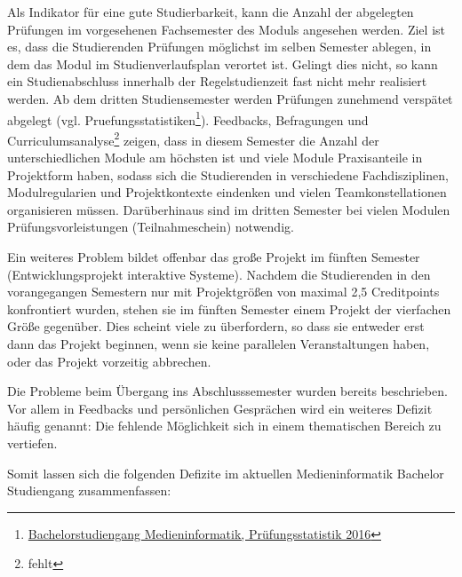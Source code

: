 Als Indikator für eine gute Studierbarkeit, kann die Anzahl der
abgelegten Prüfungen im vorgesehenen Fachsemester des Moduls angesehen
werden. Ziel ist es, dass die Studierenden Prüfungen möglichst im selben
Semester ablegen, in dem das Modul im Studienverlaufsplan verortet ist.
Gelingt dies nicht, so kann ein Studienabschluss innerhalb der
Regelstudienzeit fast nicht mehr realisiert werden. Ab dem dritten
Studiensemester werden Prüfungen zunehmend verspätet abgelegt (vgl.
Pruefungsstatistiken\footnote{\href{../anhaenge/pruefungsstatistiken.pdf}{Bachelorstudiengang
  Medieninformatik, Prüfungsstatistik 2016}}). Feedbacks, Befragungen
und Curriculumsanalyse\footnote{fehlt} zeigen, dass in diesem Semester
die Anzahl der unterschiedlichen Module am höchsten ist und viele Module
Praxisanteile in Projektform haben, sodass sich die Studierenden in
verschiedene Fachdisziplinen, Modulregularien und Projektkontexte
eindenken und vielen Teamkonstellationen organisieren müssen.
Darüberhinaus sind im dritten Semester bei vielen Modulen
Prüfungsvorleistungen (Teilnahmeschein) notwendig.

Ein weiteres Problem bildet offenbar das große Projekt im fünften
Semester (Entwicklungsprojekt interaktive Systeme). Nachdem die
Studierenden in den vorangegangen Semestern nur mit Projektgrößen von
maximal 2,5 Creditpoints konfrontiert wurden, stehen sie im fünften
Semester einem Projekt der vierfachen Größe gegenüber. Dies scheint
viele zu überfordern, so dass sie entweder erst dann das Projekt
beginnen, wenn sie keine parallelen Veranstaltungen haben, oder das
Projekt vorzeitig abbrechen.

Die Probleme beim Übergang ins Abschlusssemester wurden bereits
beschrieben. Vor allem in Feedbacks und persönlichen Gesprächen wird ein
weiteres Defizit häufig genannt: Die fehlende Möglichkeit sich in einem
thematischen Bereich zu vertiefen.

Somit lassen sich die folgenden Defizite im aktuellen Medieninformatik
Bachelor Studiengang zusammenfassen:

